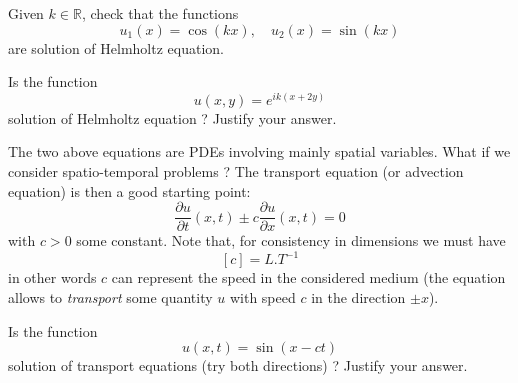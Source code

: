 \begin{Exercise}
Given $k \in \mathbb{R}$, check that the functions 
\[ u_1(x) = \cos(kx), \quad u_2(x) = \sin(kx)\]
are solution of Helmholtz equation.\\
  \dotfill

\dotfill

\dotfill

\dotfill

\dotfill

\dotfill

\dotfill

\dotfill

\dotfill

\dotfill
\end{Exercise}
\begin{Exercise}
Is the function
\[ u(x,y) = e^{ik(x + 2y)}\]
solution of Helmholtz equation ? Justify your answer.\\
  \dotfill

\dotfill

\dotfill

\dotfill

\dotfill

\dotfill

\dotfill

\dotfill

\dotfill

\dotfill
\end{Exercise}
The two above equations are PDEs involving mainly spatial variables. What if we consider spatio-temporal problems ? The transport equation (or advection equation) is then a good starting point:
\[ \displaystyle \frac{\partial u}{\partial t}(x,t) \pm c \frac{\partial u}{\partial x}(x,t) = 0 \]
with $c >0$ some constant. Note that, for consistency in dimensions we must have
\[ [c] = L. T^{-1}\]
in other words $c$ can represent the speed in the considered medium (the equation allows to \textit{transport} some quantity $u$ with speed $c$ in the direction $\pm x$). 
\begin{Exercise}
Is the function
\[ u(x,t) = \sin(x - ct)\]
solution of transport equations (try both directions) ? Justify your answer.\\
  \dotfill

\dotfill

\dotfill

\dotfill

\dotfill

\dotfill

\dotfill

\dotfill

\dotfill

\dotfill
\end{Exercise}

